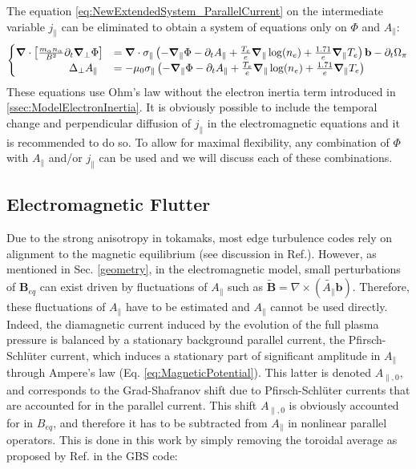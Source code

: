 The equation \ref{eq:NewExtendedSystem_ParallelCurrent} on the intermediate variable $j_\parallel$ can be eliminated to obtain a system of equations only on $\Phi$ and $A_\parallel$:
\begin{align}
	\label{eq:vorticityEquation_electromagnetic}
	\begin{cases}
		\grad\cdot\left[\frac{m_\alpha n_\alpha}{ B^2}\partial_t\grad_\perp\Phi\right] &= \grad\cdot\sigma_\parallel\left(-\grad_\parallel\Phi - \partial_tA_\parallel + \frac{T_e}{e}\grad_\parallel\log(n_e) + \frac{1.71}{e}\grad_\parallel T_e\right)\mathbf{b} - \partial_t \Omega_\pi \\
		\qquad\qquad\quad\Delta_\perp A_\parallel& = -\mu_0\sigma_\parallel\left(-\grad_\parallel\Phi - \partial_tA_\parallel + \frac{T_e}{e}\grad_\parallel\log(n_e) + \frac{1.71}{e}\grad_\parallel T_e\right)
	\end{cases}
\end{align}
These equations use Ohm's law without the electron inertia term introduced in \autoref{ssec:ModelElectronInertia}. It is obviously possible to include the temporal change and perpendicular diffusion of $j_\parallel$ in the electromagnetic equations and it is recommended to do so. To allow for maximal flexibility, any combination of $\Phi$ with $A_\parallel$ and/or $j_\parallel$ can be used and we will discuss each of these combinations.






\subsection{Electromagnetic Flutter}

Due to the strong anisotropy in tokamaks, most edge turbulence codes rely on alignment to the magnetic equilibrium (see discussion in Ref.\cite{SCHWANDER_2024}). However, as mentioned in Sec. \ref{geometry}, in the electromagnetic model, small perturbations of $\mathbf{B}_{eq}$ can exist driven by fluctuations of $A_\parallel$ such as $\tilde{\mathbf{B}} = \nabla \times (\tilde{A_\parallel} \mathbf{b})$. Therefore, these fluctuations of $A_\parallel$ have to be estimated and $A_\parallel$ cannot be used directly. Indeed, the diamagnetic current induced by the evolution of the full plasma pressure is balanced by a stationary background parallel current, the Pfirsch-Schlüter current, which induces a stationary part of significant amplitude in $A_\parallel$ through Ampere's law (Eq. \ref{eq:MagneticPotential}). This latter is denoted $A_{\parallel,0}$, and corresponds to the Grad-Shafranov shift due to Pfirsch-Schlüter currents that are accounted for in the parallel current. This shift $A_{\parallel,0}$ is obviously accounted for in $B_{eq}$, and therefore it has to be subtracted from $A_\parallel$ in nonlinear parallel operators. This is done in this work by simply removing the toroidal average as proposed by Ref.\cite{giacomin2022gbs} in the GBS code: \newline


